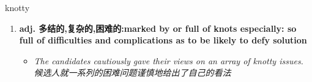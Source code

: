 
\begin{frame}
{\huge knotty}
\begin{center}
\begin{enumerate}\Large
  \item \textbf{adj. 多结的,复杂的,困难的:marked by or full of knots especially: so full of difficulties and complications as to be likely to defy solution}
  \begin{itemize}
    \item \em{\Large{The candidates cautiously gave their views on an array of knotty issues. 候选人就一系列的困难问题谨慎地给出了自己的看法}}
  \end{itemize}
\end{enumerate}
\end{center}
\end{frame}
